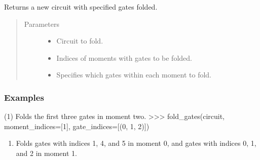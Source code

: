 \documentclass[letterpaper,10pt,english]{sphinxmanual}
\begin{document}
\begin{fulllineitems}
\label{\detokenize{apidoc:mitiq.folding_cirq.fold_gates}}
Returns a new circuit with specified gates folded.
\begin{quote}\begin{description}
\item[{Parameters}] \leavevmode\begin{itemize}
\item {} 
 \sphinxhyphen{}\sphinxhyphen{} Circuit to fold.

\item {} 
 \sphinxhyphen{}\sphinxhyphen{} Indices of moments with gates to be folded.

\item {} 
 \sphinxhyphen{}\sphinxhyphen{} Specifies which gates within each moment to fold.

\end{itemize}

\end{description}\end{quote}
\subsubsection*{Examples}

(1) Folds the first three gates in moment two.
\textgreater{}\textgreater{}\textgreater{} fold\_gates(circuit, moment\_indices={[}1{]}, gate\_indices={[}(0, 1, 2){]})
\begin{enumerate}
%
\setcounter{enumi}{1}
\item {} 
Folds gates with indices 1, 4, and 5 in moment 0,
and gates with indices 0, 1, and 2 in moment 1.

\end{enumerate}

\begin{sphinxVerbatim}[commandchars=\\\{\}]
 \PYG{p}{[} \PYG{p}{]} \PYG{p}{[}     \PYG{p}{]}
\end{sphinxVerbatim}

\end{fulllineitems}
\end{document}
